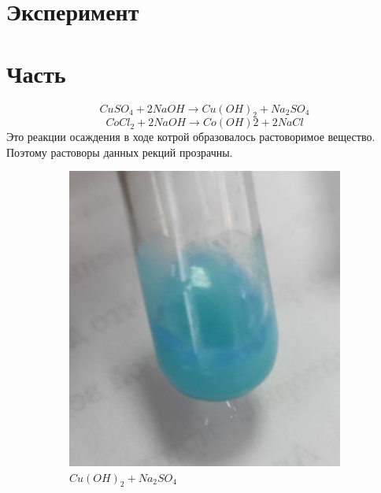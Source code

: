 \section{Эксперимент}
\section{Часть}
\begin{equation} 
    CuSO_4 + 2NaOH \xrightarrow{}  Cu(OH)_2 + Na_2SO_4
\end{equation} 
\begin{equation} 
    CoCl_2 + 2NaOH \xrightarrow{} Co(OH)2 + 2NaCl
\end{equation} 
Это реакции осаждения в ходе котрой образовалось растоворимое 
вещество. Поэтому растоворы данных рекций прозрачны.

\begin{figure}[h]
    \centering
    \begin{subfigure}[b]{0.45\textwidth}
    \includegraphics[width=\textwidth]{Ex_5/Cu_1.jpg}
    \caption{$Cu(OH)_2 + Na_2SO_4$}
    \end{subfigure}
    \quad
    \begin{subfigure}[b]{0.45\textwidth}

\end{subfigure}
\end{figure}
